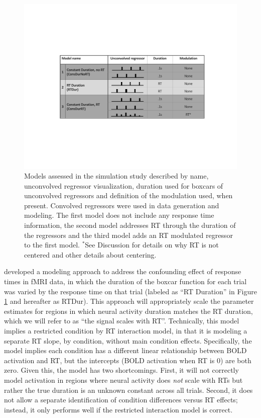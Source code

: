 \documentclass[titlepage,12pt] {article}
\begin{document}
\begin{figure}
  \centering
   \includegraphics[width=6in]{Figures/model_explainer_new.pdf}
   \caption{Models assessed in the simulation study described by name, unconvolved regressor visualization, duration used for boxcars of unconvolved regressors and definition of the modulation used, when present.  Convolved regressors were used in data generation and modeling.  The first model does not include any response time information, the second model addresses RT through the duration of the regressors and the third model adds an RT modulated regressor to the first model.  $^*$See Discussion for details on why RT is not centered and other details about centering.}
  \label{fig:models}
\end{figure}

\citet{grinband_detection_2008} developed a modeling approach to address the confounding effect of response times in fMRI data, in which the duration of the boxcar function for each trial was varied by the response time on that trial (labeled as ``RT Duration'' in Figure \ref{fig:models} and hereafter as RTDur).  This approach will appropriately scale the parameter estimates for regions in which neural activity duration matches the RT duration, which we will refer to as ``the signal scales with RT''.  Technically, this model implies a restricted condition by RT interaction model, in that it is modeling a separate RT slope, by condition, without main condition effects. Specifically, the model implies each condition has a different linear relationship between BOLD activation and RT, but the intercepts (BOLD activation when RT is 0) are both zero.  Given this, the model has two shortcomings. First, it will not correctly model activation in regions where neural activity does \textit{not} scale with RTs but rather the true duration is an unknown constant across all trials.  Second, it does not allow a separate identification of condition differences versus RT effects; instead, it only performs well if the restricted interaction model is correct.  
\end{document}
